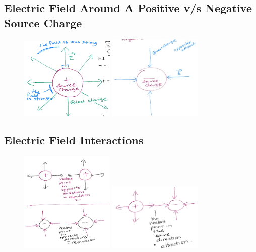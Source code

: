 \documentclass[a4paper,12pt]{article}
\begin{document}
\subsection{Electric Field Around A Positive v/s Negative Source Charge}
\begin{figure}[H]
    \centering
    \includegraphics[width=0.4\textwidth]{lines}
    \includegraphics[width=0.4\textwidth]{lines2}
\end{figure}

\subsection{Electric Field Interactions}
\begin{figure}[H]
    \centering
    \includegraphics[width=0.4\textwidth]{repel}
    \includegraphics[width=0.4\textwidth]{attract}
\end{figure}
\end{document}
